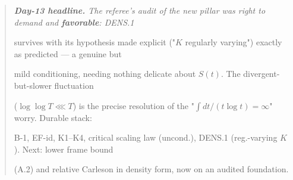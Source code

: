 \documentclass[10pt]{article}
\begin{document}
\begin{quote}\itshape
\textbf{Day-13 headline.} The referee's audit of the new pillar was right to demand and \textbf{favorable}: DENS.1\par
survives with its hypothesis made explicit ("$K$ regularly varying") exactly as predicted --- a genuine but\par
mild conditioning, needing nothing delicate about $S(t)$. The divergent-but-slower fluctuation\par
($\log\log T\lll T$) is the precise resolution of the "$\int dt/(t\log t)=\infty$" worry. Durable stack:\par
B-1, EF-id, K1--K4, critical scaling law (uncond.), DENS.1 (reg.-varying $K$). Next: lower frame bound\par
(A.2) and relative Carleson in density form, now on an audited foundation.\par
\end{quote}
\end{document}
